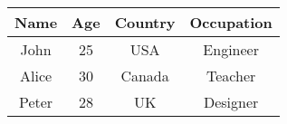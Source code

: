 \begin{table}[htbp]
\centering
\label{tab:example}
\begin{tabular}{|c|c|c|c|}
\hline
Name & Age & Country & Occupation  \\
\hline
John & 25 & USA & Engineer  \\
\hline
Alice & 30 & Canada & Teacher  \\
\hline
Peter & 28 & UK & Designer  \\
\hline
\end{tabular}
\end{table}
